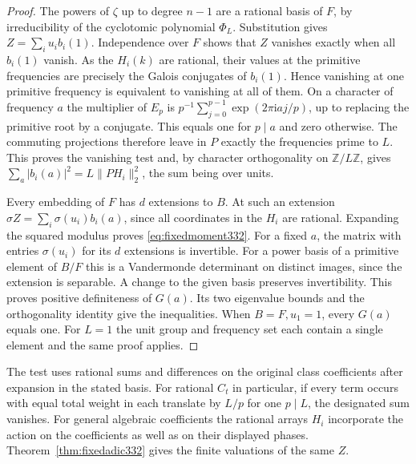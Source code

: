 \documentclass[a4paper,11pt]{article}
\theoremstyle{definition}
\theoremstyle{remark}
\newcommand{\ZZ}{\mathbb Z}\newcommand{\ord}{\operatorname{ord}}
\numberwithin{equation}{section}
\begin{document}
\begin{proof}
The powers of \(\zeta\) up to degree \(n-1\) are a rational basis
of \(F\), by irreducibility of the cyclotomic polynomial
\(\Phi_L\). Substitution gives \(Z=\sum_i u_i b_i(1)\).
Independence over \(F\) shows that \(Z\) vanishes exactly when
all \(b_i(1)\) vanish. As the \(H_i(k)\) are rational, their values
at the primitive frequencies are precisely the Galois conjugates
of \(b_i(1)\). Hence vanishing at one primitive frequency is
equivalent to vanishing at all of them. On a character of frequency
\(a\) the multiplier of \(E_p\) is \(p^{-1}\sum_{j=0}^{p-1}
\exp(2\pi\mathrm{i}aj/p)\), up to replacing the primitive root by
a conjugate. This equals one for \(p\mid a\) and zero otherwise.
The commuting projections therefore leave in \(P\) exactly the
frequencies prime to \(L\). This proves the vanishing test and,
by character orthogonality on \(\ZZ/L\ZZ\), gives
\(\sum_a |b_i(a)|^2=L\|PH_i\|_2^2\), the sum being over units.

Every embedding of \(F\) has \(d\) extensions to \(B\). At such
an extension \(\sigma Z=\sum_i\sigma(u_i)b_i(a)\), since all
coordinates in the \(H_i\) are rational. Expanding the squared
modulus proves \eqref{eq:fixedmoment332}. For a fixed \(a\), the
matrix with entries \(\sigma(u_i)\) for its \(d\) extensions is
invertible. For a power basis of a primitive element of \(B/F\)
this is a Vandermonde determinant on distinct images, since the
extension is separable. A change to the given basis preserves
invertibility. This proves positive definiteness of \(G(a)\).
Its two eigenvalue bounds and the orthogonality identity give
the inequalities. When \(B=F,u_1=1\), every \(G(a)\) equals one.
For \(L=1\) the unit group and frequency set each contain a single
element and the same proof applies.
\end{proof}

The test uses rational sums and differences on the original class
coefficients after expansion in the stated basis. For rational
\(C_t\) in particular, if every term occurs with equal total weight
in each translate by \(L/p\) for one \(p\mid L\), the designated
sum vanishes. For general algebraic coefficients the rational arrays
\(H_i\) incorporate the action on the coefficients as well as on
their displayed phases. Theorem~\ref{thm:fixedadic332} gives the
finite valuations of the same \(Z\).
\end{document}
